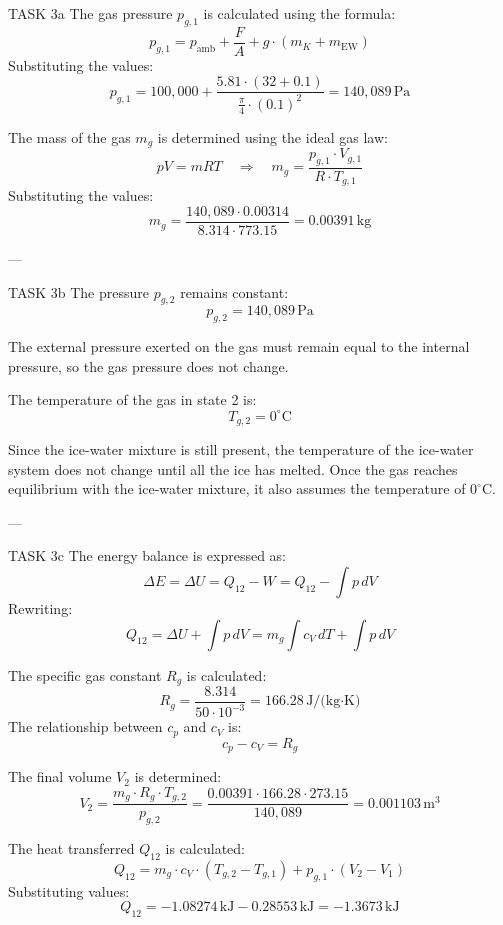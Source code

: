 TASK 3a  
The gas pressure \( p_{g,1} \) is calculated using the formula:  
\[
p_{g,1} = p_{\text{amb}} + \frac{F}{A} + g \cdot (m_K + m_{\text{EW}})
\]  
Substituting the values:  
\[
p_{g,1} = 100,000 + \frac{5.81 \cdot (32 + 0.1)}{\frac{\pi}{4} \cdot (0.1)^2} = 140,089 \, \text{Pa}
\]  

The mass of the gas \( m_g \) is determined using the ideal gas law:  
\[
pV = mRT \quad \Rightarrow \quad m_g = \frac{p_{g,1} \cdot V_{g,1}}{R \cdot T_{g,1}}
\]  
Substituting the values:  
\[
m_g = \frac{140,089 \cdot 0.00314}{8.314 \cdot 773.15} = 0.00391 \, \text{kg}
\]  

---

TASK 3b  
The pressure \( p_{g,2} \) remains constant:  
\[
p_{g,2} = 140,089 \, \text{Pa}
\]  

The external pressure exerted on the gas must remain equal to the internal pressure, so the gas pressure does not change.  

The temperature of the gas in state 2 is:  
\[
T_{g,2} = 0^\circ\text{C}
\]  

Since the ice-water mixture is still present, the temperature of the ice-water system does not change until all the ice has melted. Once the gas reaches equilibrium with the ice-water mixture, it also assumes the temperature of \( 0^\circ\text{C} \).  

---

TASK 3c  
The energy balance is expressed as:  
\[
\Delta E = \Delta U = Q_{12} - W = Q_{12} - \int p \, dV
\]  
Rewriting:  
\[
Q_{12} = \Delta U + \int p \, dV = m_g \int c_V \, dT + \int p \, dV
\]  

The specific gas constant \( R_g \) is calculated:  
\[
R_g = \frac{8.314}{50 \cdot 10^{-3}} = 166.28 \, \text{J/(kg·K)}
\]  
The relationship between \( c_p \) and \( c_V \) is:  
\[
c_p - c_V = R_g
\]  

The final volume \( V_2 \) is determined:  
\[
V_2 = \frac{m_g \cdot R_g \cdot T_{g,2}}{p_{g,2}} = \frac{0.00391 \cdot 166.28 \cdot 273.15}{140,089} = 0.001103 \, \text{m}^3
\]  

The heat transferred \( Q_{12} \) is calculated:  
\[
Q_{12} = m_g \cdot c_V \cdot (T_{g,2} - T_{g,1}) + p_{g,1} \cdot (V_2 - V_1)
\]  
Substituting values:  
\[
Q_{12} = -1.08274 \, \text{kJ} - 0.28553 \, \text{kJ} = -1.3673 \, \text{kJ}
\]  

